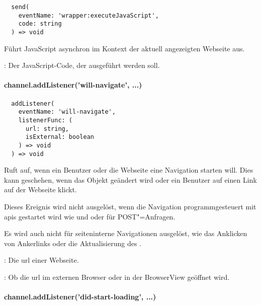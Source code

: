\begin{verbatim}
  send(
    eventName: 'wrapper:executeJavaScript',
    code: string
  ) => void
\end{verbatim}

Führt JavaScript asynchron im Kontext der aktuell angezeigten Webseite aus.

\begin{arguments}
  \item {}: Der JavaScript-Code, der ausgeführt werden soll.
\end{arguments}


\paragraph{channel.addListener('will-navigate', ...)}

\begin{verbatim}
  addListener(
    eventName: 'will-navigate',
    listenerFunc: (
      url: string,
      isExternal: boolean
    ) => void
  ) => void
\end{verbatim}

Ruft  auf, wenn ein Benutzer oder die Webseite eine Navigation starten will.
Dies kann geschehen, wenn das Objekt  geändert wird oder ein Benutzer auf einen Link auf der Webseite klickt.

Dieses Ereignis wird nicht ausgelöst, wenn die Navigation programmgesteuert mit \acsp{api} gestartet wird wie  und  oder für POST"=Anfragen.

Es wird auch nicht für seiteninterne Navigationen ausgelöst, wie das Anklicken von Ankerlinks oder die Aktualisierung des .

\begin{arguments}
  \item {}: Die \ac{url} einer Webseite.
  \item {}: Ob die \ac{url} im externen Browser oder in der BrowserView geöffnet wird.
\end{arguments}


\newpage

\paragraph{channel.addListener('did-start-loading', ...)}

